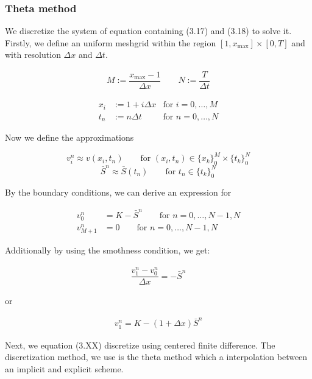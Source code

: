
\subsubsection{Theta method}

We discretize the system of equation containing (3.17) and (3.18) to solve it. 
Firstly, we define an uniform meshgrid within the region $[1, x_\text{max}]\times [0, T]$ and 
with resolution $\Delta x$ and $\Delta t$.

\begin{align*}
    M := \dfrac{x_{\text{max}} - 1}{\Delta x}
    \qquad
    N := \dfrac{T}{\Delta t}
\end{align*}

\begin{align*}
   & & x_i &:= 1 + i{\Delta x} &\text{for $i = 0,\dots,M$} & & \\ 
   & & t_n &:= n{\Delta t} &\text{for $n = 0,\dots,N$} & &
\end{align*}

Now we define the approximations

\begin{equation}
    v^{n}_{i} \approx v(x_{i}, t_{n}) \qquad \text{for $(x_{i}, t_{n}) \in \{x_k\}^{M}_{0} \times \{t_k\}^{N}_{0}$} 
\end{equation}
\begin{equation}
    \bar{S}^{n} \approx \bar{S}(t_{n}) \qquad \text{for $t_{n} \in \{t_k\}^{N}_{0}$} 
\end{equation}

By the boundary conditions, we can derive an expression for

\begin{align}
    v^{n}_{0} &= K - \bar{S}^{n} \qquad \text{for $n = 0, \dots, N - 1, N$} \\
    v^{n}_{M+1} &= 0 \qquad \text{for $n = 0, \dots, N - 1, N$}
\end{align}

Additionally by using the smothness condition, we get:

\begin{align}
    \dfrac{v^{n}_{1} - v^{n}_0}{\Delta x} = -\bar{S}^{n}
\end{align}

or 

\begin{align}
    v^{n}_{1}= K - (1 + {\Delta x})\bar{S}^{n}
\end{align}

Next, we equation (3.XX) discretize using centered finite difference. The discretization
method, we use is the theta method which a interpolation between an implicit and explicit scheme.

